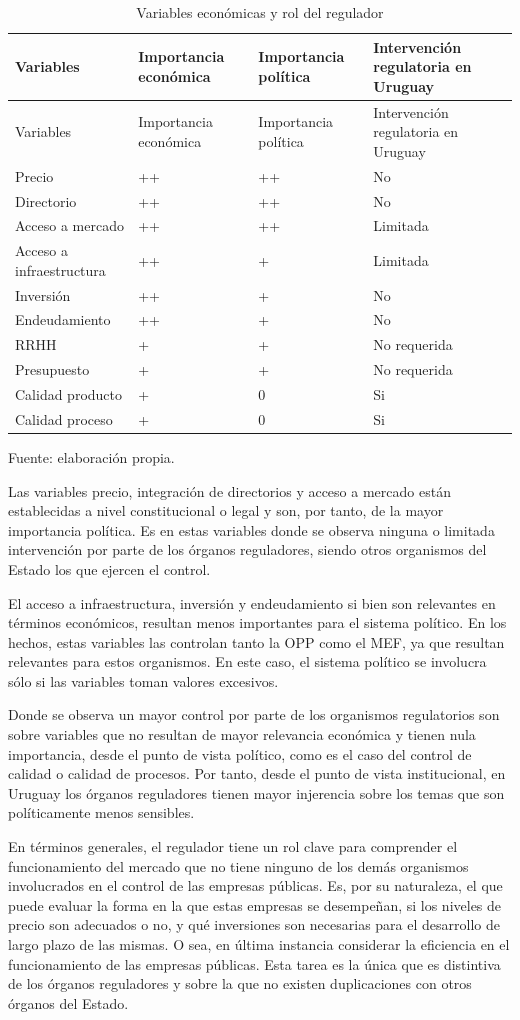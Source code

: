 \documentclass[
  12pt,
  spanish,
]{book}
\begin{document}
\begin{longtable}[]{@{}llll@{}}
\caption{Variables económicas y rol del regulador}\tabularnewline
\toprule
Variables & Importancia económica & Importancia política & Intervención
regulatoria en Uruguay\tabularnewline
\midrule
\endfirsthead
\toprule
Variables & Importancia económica & Importancia política & Intervención
regulatoria en Uruguay\tabularnewline
\midrule
\endhead
Precio & ++ & ++ & No\tabularnewline
Directorio & ++ & ++ & No\tabularnewline
Acceso a mercado & ++ & ++ & Limitada\tabularnewline
Acceso a infraestructura & ++ & + & Limitada\tabularnewline
Inversión & ++ & + & No\tabularnewline
Endeudamiento & ++ & + & No\tabularnewline
RRHH & + & + & No requerida\tabularnewline
Presupuesto & + & + & No requerida\tabularnewline
Calidad producto & + & 0 & Si\tabularnewline
Calidad proceso & + & 0 & Si\tabularnewline
\bottomrule
\end{longtable}

Fuente: elaboración propia.

Las variables precio, integración de directorios y acceso a mercado
están establecidas a nivel constitucional o legal y son, por tanto, de
la mayor importancia política. Es en estas variables donde se observa
ninguna o limitada intervención por parte de los órganos reguladores,
siendo otros organismos del Estado los que ejercen el control.

El acceso a infraestructura, inversión y endeudamiento si bien son
relevantes en términos económicos, resultan menos importantes para el
sistema político. En los hechos, estas variables las controlan tanto la
OPP como el MEF, ya que resultan relevantes para estos organismos. En
este caso, el sistema político se involucra sólo si las variables toman
valores excesivos.

Donde se observa un mayor control por parte de los organismos
regulatorios son sobre variables que no resultan de mayor relevancia
económica y tienen nula importancia, desde el punto de vista político,
como es el caso del control de calidad o calidad de procesos. Por tanto,
desde el punto de vista institucional, en Uruguay los órganos
reguladores tienen mayor injerencia sobre los temas que son
políticamente menos sensibles.

En términos generales, el regulador tiene un rol clave para comprender
el funcionamiento del mercado que no tiene ninguno de los demás
organismos involucrados en el control de las empresas públicas. Es, por
su naturaleza, el que puede evaluar la forma en la que estas empresas se
desempeñan, si los niveles de precio son adecuados o no, y qué
inversiones son necesarias para el desarrollo de largo plazo de las
mismas. O sea, en última instancia considerar la eficiencia en el
funcionamiento de las empresas públicas. Esta tarea es la única que es
distintiva de los órganos reguladores y sobre la que no existen
duplicaciones con otros órganos del Estado.
\end{document}
